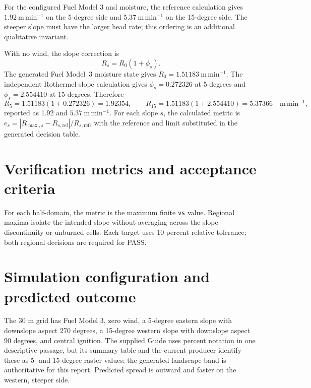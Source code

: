 For the configured Fuel Model 3 and moisture, the reference calculation gives \(1.92~\mathrm{m\,min^{-1}}\) on the 5-degree side and \(5.37~\mathrm{m\,min^{-1}}\) on the 15-degree side.  The steeper slope must have the larger head rate; this ordering is an additional qualitative invariant.

With no wind, the slope correction is
\[
 R_s=R_0(1+\phi_s).
\]
The generated Fuel Model~3 moisture state gives
\(R_0=1.51183~\mathrm{m\,min^{-1}}\).  The independent Rothermel slope
calculation gives \(\phi_s=0.272326\) at 5 degrees and
\(\phi_s=2.554410\) at 15 degrees.  Therefore
\[
 R_{5}=1.51183(1+0.272326)=1.92354,\qquad
 R_{15}=1.51183(1+2.554410)=5.37366
 \quad\mathrm{m\,min^{-1}},
\]
reported as 1.92 and \(5.37~\mathrm{m\,min^{-1}}\).  For each slope
\(s\), the calculated metric is
\(e_s=|R_{\max,s}-R_{s,\mathrm{ref}}|/R_{s,\mathrm{ref}}\), with the
reference and limit substituted in the generated decision table.

\section{Verification metrics and acceptance criteria}

For each half-domain, the metric is the maximum finite \texttt{vs} value. Regional maxima isolate the intended slope without averaging across the slope discontinuity or unburned cells. Each target uses 10 percent relative tolerance; both regional decisions are required for PASS.

\section{Simulation configuration and predicted outcome}

The 30 m grid has Fuel Model 3, zero wind, a 5-degree eastern slope with downslope aspect 270 degrees, a 15-degree western slope with downslope aspect 90 degrees, and central ignition. The supplied Guide uses percent notation in one descriptive passage, but its summary table and the current producer identify these as 5- and 15-degree raster values; the generated landscape band is authoritative for this report. Predicted spread is outward and faster on the western, steeper side.

